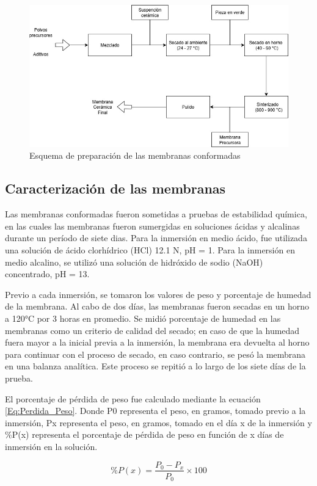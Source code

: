 \documentclass{article}
\begin{document}
\begin{figure}[ht]
    \centering
    \includegraphics[width=0.7\linewidth]{Esquema de preparacion de membranas ceramicas.jpg}
    \caption{Esquema de preparación de las membranas conformadas}
    \label{fig:Esq_PrepMembranas}
\end{figure}

\subsection{Caracterización de las membranas}

Las membranas conformadas fueron sometidas a pruebas de estabilidad 
química, en las cuales las membranas fueron sumergidas en soluciones 
ácidas y alcalinas durante un período de siete dias. Para la inmersión 
en medio ácido, fue utilizada una solución de ácido clorhídrico 
(HCl) 12.1 N, pH = 1. Para la inmersión en medio alcalino, se utilizó 
una solución de hidróxido de sodio (NaOH) concentrado, pH = 13. 

Previo a cada inmersión, se tomaron los valores de peso y porcentaje 
de humedad de la membrana. Al cabo de dos días, las membranas fueron 
secadas en un horno a 120°C por 3 horas en promedio. 
Se midió porcentaje de humedad en las membranas como un criterio de 
calidad del secado; en caso de que la humedad fuera mayor a la 
inicial previa a la inmersión, la membrana era devuelta al horno 
para continuar con el proceso de secado, en caso contrario, se pesó 
la membrana en una balanza analítica. Este proceso se repitió a lo 
largo de los siete días de la prueba. 

El porcentaje de pérdida de peso fue calculado mediante la 
ecuación \ref{Eq:Perdida_Peso}. Donde P0 representa el peso, 
en gramos, tomado previo a la inmersión, Px representa el peso, 
en gramos, tomado en el día x de la inmersión y \%P(x) representa 
el porcentaje de pérdida de peso en función de x días de inmersión 
en la solución.   

\begin{equation}
    \%P(x) = \frac{P_0-P_x}{P_0} \times 100
    \label{Eq:Perdida_Peso}
\end{equation}
\end{document}
